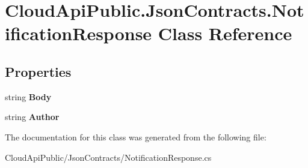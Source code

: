 \hypertarget{class_cloud_api_public_1_1_json_contracts_1_1_notification_response}{\section{Cloud\-Api\-Public.\-Json\-Contracts.\-Notification\-Response Class Reference}
\label{class_cloud_api_public_1_1_json_contracts_1_1_notification_response}
}
\subsection*{Properties}
\begin{DoxyCompactItemize}
\item 
\hypertarget{class_cloud_api_public_1_1_json_contracts_1_1_notification_response_ae3010d89f0308df8f5d08d5516d9ae1b}{string {\bfseries Body}}\label{class_cloud_api_public_1_1_json_contracts_1_1_notification_response_ae3010d89f0308df8f5d08d5516d9ae1b}

\item 
\hypertarget{class_cloud_api_public_1_1_json_contracts_1_1_notification_response_a60d6be9ccb595fbfbf982fe925ee7939}{string {\bfseries Author}}\label{class_cloud_api_public_1_1_json_contracts_1_1_notification_response_a60d6be9ccb595fbfbf982fe925ee7939}

\end{DoxyCompactItemize}


The documentation for this class was generated from the following file\-:\begin{DoxyCompactItemize}
\item 
Cloud\-Api\-Public/\-Json\-Contracts/Notification\-Response.\-cs\end{DoxyCompactItemize}
